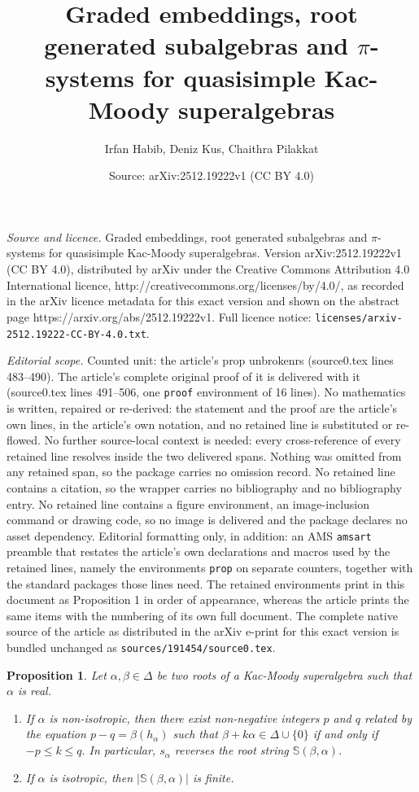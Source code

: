 \documentclass[10pt,a4paper]{amsart}
\title{Graded embeddings, root generated subalgebras and $\pi$-systems for quasisimple Kac-Moody superalgebras}
\author{Irfan Habib, Deniz Kus, Chaithra Pilakkat}
\date{Source: arXiv:2512.19222v1 (CC BY 4.0)}
\newtheorem{prop}{Proposition}
\begin{document}
\maketitle

\noindent\emph{Source and licence.} Graded embeddings, root generated subalgebras and $\pi$-systems for quasisimple Kac-Moody superalgebras. Version arXiv:2512.19222v1 (CC BY 4.0), distributed by arXiv under the Creative Commons Attribution 4.0 International licence, http://creativecommons.org/licenses/by/4.0/, as recorded in the arXiv licence metadata for this exact version and shown on the abstract page https://arxiv.org/abs/2512.19222v1. Full licence notice: \texttt{licenses/arxiv-2512.19222-CC-BY-4.0.txt}.\par\smallskip

\noindent\textit{Editorial scope.} Counted unit: the article's prop unbrokenrs (source0.tex lines 483--490). The article's complete original proof of it is delivered with it (source0.tex lines 491--506, one \texttt{proof} environment of 16 lines). No mathematics is written, repaired or re-derived: the statement and the proof are the article's own lines, in the article's own notation, and no retained line is substituted or re-flowed.  No further source-local context is needed: every cross-reference of every retained line resolves inside the two delivered spans.  Nothing was omitted from any retained span, so the package carries no omission record.  No retained line contains a citation, so the wrapper carries no bibliography and no bibliography entry.  No retained line contains a figure environment, an image-inclusion command or drawing code, so no image is delivered and the package declares no asset dependency.  Editorial formatting only, in addition: an AMS \texttt{amsart} preamble that restates the article's own declarations and macros used by the retained lines, namely the environments \texttt{prop} on separate counters, together with the standard packages those lines need.  The retained environments print in this document as Proposition 1 in order of appearance, whereas the article prints the same items with the numbering of its own full document.  The complete native source of the article as distributed in the arXiv e-print for this exact version is bundled unchanged as \texttt{sources/191454/source0.tex}.
\begin{prop}\label{unbrokenrs}
Let $\alpha,\beta\in \Delta$ be two roots of a Kac-Moody superalgebra such that $\alpha$ is real.

\begin{enumerate}
    \item  If $\alpha$ is non-isotropic, then there exist non-negative integers $p$ and $q$ related by the equation $p-q=\beta(h_\alpha)$ such that $\beta+k\alpha\in \Delta\cup \{0\}$ if and only if $-p\le k\le q.$ In particular, $s_\alpha$ reverses the root string $\mathbb{S}(\beta,\alpha)$. \vspace{0,1cm}
    \item If $\alpha$ is isotropic, then $|\mathbb{S}(\beta,\alpha)|$ is finite.
\end{enumerate}
\end{prop}
\end{document}
